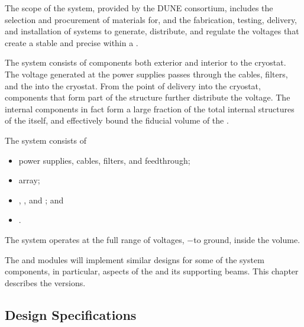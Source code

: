 
The scope of the \single {} system, provided by the DUNE  consortium, includes the selection and procurement of materials for, and the fabrication, testing, delivery, and installation of systems to generate, distribute, and regulate the voltages that
create a stable and precise \efield{} within a . 

The  system consists of components both exterior and interior to the cryostat. The voltage generated at the  power supplies passes through the cables, filters, and the  \fdth into the cryostat. From the point of delivery into the cryostat, components that form part of the  structure further distribute the voltage. The internal  components in fact form a large fraction of the total internal structures of the  itself, and  
 effectively bound the  fiducial volume of the %
 . %

The   system consists of
\begin{itemize}
\item {} power supplies, cables, filters, and feedthrough;
\item {} array;
\item {}, , and ; and
\item {}.
\end{itemize}


The system operates at the full range of voltages, %
$-$\sptargetdriftvoltpos to ground, inside the  volume. 

The   and   modules will implement similar designs for some
 of the  system components, %
 in particular, aspects of the  and its supporting beams. This chapter describes the   versions. 
 
\subsection{Design Specifications}
\label{sec:fdsp-hv-des-consid}

